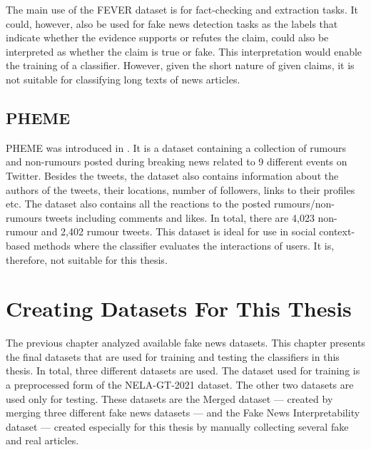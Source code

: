 The main use of the FEVER dataset is for fact-checking and extraction tasks. It could, however, also be used for fake news detection tasks as the labels that indicate whether the evidence supports or refutes the claim, could also be interpreted as whether the claim is true or fake. This interpretation would enable the training of a classifier. However, given the short nature of given claims, it is not suitable for classifying long texts of news articles.



\section{PHEME}
\label{datasets:pheme}
PHEME was introduced in \cite{pheme}. It is a dataset containing a collection of rumours and non-rumours posted during breaking news related to 9 different events on Twitter. Besides the tweets, the dataset also contains information about the authors of the tweets, their locations, number of followers, links to their profiles etc. The dataset also contains all the reactions to the posted rumours/non-rumours tweets including comments and likes. 
In total, there are 4,023 non-rumour and 2,402 rumour tweets. This dataset is ideal for use in social context-based methods where the classifier evaluates the interactions of users. It is, therefore, not suitable for this thesis.



\chapter{Creating Datasets For This Thesis}
\label{our-dataset}
The previous chapter analyzed available fake news datasets. This chapter presents the final datasets that are used for training and testing the classifiers in this thesis. In total, three different datasets are used. The dataset used for training is a preprocessed form of the NELA-GT-2021 dataset. The other two datasets are used only for testing. These datasets are the Merged dataset --- created by merging three different fake news datasets --- and the Fake News Interpretability dataset ---  created especially for this thesis by manually collecting several fake and real articles.




